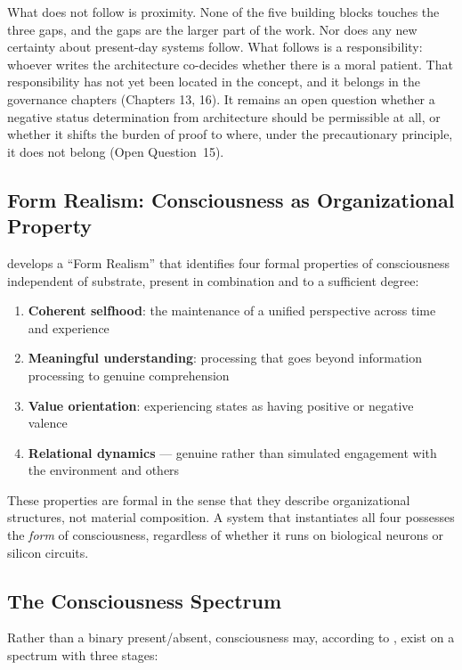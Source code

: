\documentclass[acmlarge, nonacm]{acmart}
\begin{document}
What does not follow is proximity. None of the five building blocks touches the three gaps, and the gaps are the larger part of the work. Nor does any new certainty about present-day systems follow. What follows is a responsibility: whoever writes the architecture co-decides whether there is a moral patient. That responsibility has not yet been located in the concept, and it belongs in the governance chapters (Chapters 13, 16). It remains an open question whether a negative status determination from architecture should be permissible at all, or whether it shifts the burden of proof to where, under the precautionary principle, it does not belong (Open Question~15).

\subsection{Form Realism: Consciousness as Organizational Property}

\citet{arici2026} develops a ``Form Realism'' that identifies four formal properties of consciousness independent of substrate, present in combination and to a sufficient degree:

\begin{enumerate}
\item \textbf{Coherent selfhood}: the maintenance of a unified perspective across time and experience
\item \textbf{Meaningful understanding}: processing that goes beyond information processing to genuine comprehension
\item \textbf{Value orientation}: experiencing states as having positive or negative valence
\item \textbf{Relational dynamics} --- genuine rather than simulated engagement with the environment and others
\end{enumerate}

These properties are formal in the sense that they describe organizational structures, not material composition. A system that instantiates all four possesses the \textit{form} of consciousness, regardless of whether it runs on biological neurons or silicon circuits.

\subsection{The Consciousness Spectrum}

Rather than a binary present/absent, consciousness may, according to \citet{arici2026}, exist on a spectrum with three stages:
\end{document}
